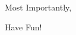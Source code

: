 \begin{frame}{}
    \centering
    Most Importantly,\pause

    \Huge \alert{Have Fun!}
\end{frame}
